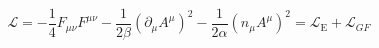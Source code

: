 \begin{equation}
\mathcal{L}=-\frac{1}{4}F_{\mu \nu }F^{\mu \nu }-\frac{1}{2\beta }\left(
\partial _{\mu }A^{\mu }\right) ^{2}-\frac{1}{2\alpha }\left( n_{\mu }A^{\mu
}\right) ^{2}=\mathcal{L}_{\text{E}}+\mathcal{L}_{GF}  \label{2}
\end{equation}

